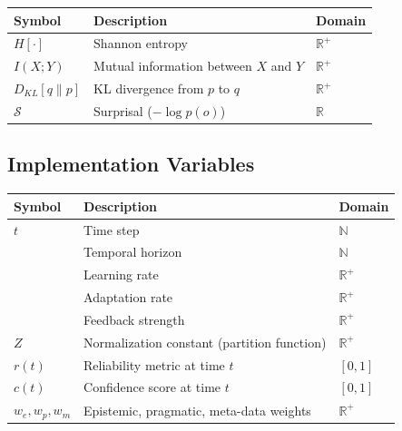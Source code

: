 \documentclass[
]{article}
\newcounter{none} %
\begin{document}
{\def\LTcaptype{none} %
\begin{longtable}[]{@{}lll@{}}
\toprule\noalign{}
Symbol & Description & Domain \\
\midrule\noalign{}
\endhead
\bottomrule\noalign{}
\endlastfoot
\(H[\cdot]\) & Shannon entropy & \(\mathbb{R}^+\) \\
\(I(X;Y)\) & Mutual information between \(X\) and \(Y\) &
\(\mathbb{R}^+\) \\
\(D_{KL}[q\|p]\) & KL divergence from \(p\) to \(q\) &
\(\mathbb{R}^+\) \\
\(\mathcal{S}\) & Surprisal (\(-\log p(o)\)) & \(\mathbb{R}\) \\
\end{longtable}
}

\subsection{Implementation Variables}\label{implementation-variables}

{\def\LTcaptype{none} %
\begin{longtable}[]{@{}
  >{\raggedright\arraybackslash}p{}
  >{\raggedright\arraybackslash}p{}
  >{\raggedright\arraybackslash}p{}@{}}
\toprule\noalign{}
\begin{minipage}[b]{\linewidth}\raggedright
Symbol
\end{minipage} & \begin{minipage}[b]{\linewidth}\raggedright
Description
\end{minipage} & \begin{minipage}[b]{\linewidth}\raggedright
Domain
\end{minipage} \\
\midrule\noalign{}
\endhead
\bottomrule\noalign{}
\endlastfoot
\(t\) & Time step & \(\mathbb{N}\) \\
\(\tau) & Temporal horizon & \(\mathbb{N}\) \\
\(\eta) & Learning rate & \(\mathbb{R}^+\) \\
\(\alpha) & Adaptation rate & \(\mathbb{R}^+\) \\
\(\beta) & Feedback strength & \(\mathbb{R}^+\) \\
\(Z\) & Normalization constant (partition function) &
\(\mathbb{R}^+\) \\
\(r(t)\) & Reliability metric at time \(t\) & \([0,1]\) \\
\(c(t)\) & Confidence score at time \(t\) & \([0,1]\) \\
\(w_e, w_p, w_m\) & Epistemic, pragmatic, meta-data weights &
\(\mathbb{R}^+\) \\
\end{longtable}
}
\end{document}
